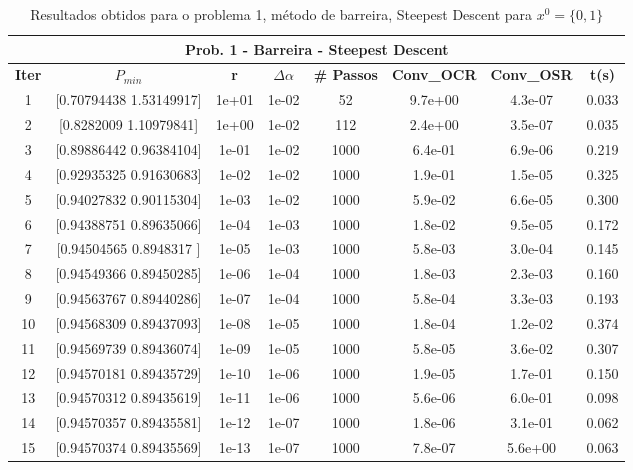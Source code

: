 \documentclass[10pt, a4paper]{article}
\begin{document}
\vspace{5mm}
\begin{table}[H]
  \begin{center}
    \begin{tabular}{c|c|c|c|c|c|c|c}
      \multicolumn{8}{c}{\textbf{Prob. 1 - Barreira - Steepest Descent}}\\
      \hline
      \textbf{Iter} & \textbf{$P_{min}$} & \textbf{r} & $\Delta \alpha$ &\textbf{\# Passos} & \textbf{Conv\_OCR} & \textbf{Conv\_OSR} & \textbf{t(s)}\\
      \hline
        1& [0.70794438 1.53149917]& 1e+01& 1e-02 &52& 9.7e+00& 4.3e-07& 0.033       \\
        2& [0.8282009  1.10979841]& 1e+00& 1e-02 &112& 2.4e+00& 3.5e-07& 0.035\\
        3& [0.89886442 0.96384104]& 1e-01& 1e-02 &1000& 6.4e-01& 6.9e-06& 0.219\\
        4& [0.92935325 0.91630683]& 1e-02& 1e-02 &1000& 1.9e-01& 1.5e-05& 0.325\\
        5& [0.94027832 0.90115304]& 1e-03& 1e-02 &1000& 5.9e-02& 6.6e-05& 0.300\\
        6& [0.94388751 0.89635066]& 1e-04& 1e-03 &1000& 1.8e-02& 9.5e-05& 0.172\\
        7& [0.94504565 0.8948317 ]& 1e-05& 1e-03 &1000& 5.8e-03& 3.0e-04& 0.145\\
        8& [0.94549366 0.89450285]& 1e-06& 1e-04 &1000& 1.8e-03& 2.3e-03& 0.160\\
        9& [0.94563767 0.89440286]& 1e-07& 1e-04 &1000& 5.8e-04& 3.3e-03& 0.193\\
        10& [0.94568309 0.89437093]& 1e-08& 1e-05 &1000& 1.8e-04& 1.2e-02& 0.374\\
        11& [0.94569739 0.89436074]& 1e-09& 1e-05 &1000& 5.8e-05& 3.6e-02& 0.307\\
        12& [0.94570181 0.89435729]& 1e-10& 1e-06 &1000& 1.9e-05& 1.7e-01& 0.150\\
        13& [0.94570312 0.89435619]& 1e-11& 1e-06 &1000& 5.6e-06& 6.0e-01& 0.098\\
        14& [0.94570357 0.89435581]& 1e-12& 1e-07 &1000& 1.8e-06& 3.1e-01& 0.062\\
        15& [0.94570374 0.89435569]& 1e-13& 1e-07 &1000& 7.8e-07& 5.6e+00& 0.063\\
    \end{tabular}
  \end{center}
  \caption{Resultados obtidos para o problema 1, método de barreira, Steepest Descent para $x^0=\{0,1\}$}
\end{table}
\end{document}
